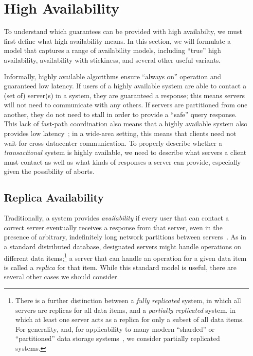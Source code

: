 
\section{High Availability}
\label{sec:availability}

To understand which guarantees can be provided with high availabilty,
we must first define what high availability means. In this section, we
will formulate a model that captures a range of availability models,
including ``true'' high availability, availability with stickiness,
and several other useful variants.

Informally, highly available algorithms ensure ``always on'' operation
and guaranteed low latency. If users of a highly available system are
able to contact a (set of) server(s) in a system, they are guaranteed
a response; this means servers will not need to communicate with any
others. If servers are partitioned from one another, they do not need
to stall in order to provide a ``safe'' query response. This lack of
fast-path coordination also means that a highly available system also
provides low latency~\cite{abadi-pacelc}; in a wide-area setting, this
means that clients need not wait for cross-datacenter
communication. To properly describe whether a \textit{transactional}
system is highly available, we need to describe what servers a client
must contact as well as what kinds of responses a server can provide,
especially given the possibility of aborts.

\subsection{Replica Availability}

Traditionally, a system provides {\em  availability} if every user that
can contact a correct server eventually receives a response from that server,
even in the presence of arbitrary, indefinitely long network
partitions between servers~\cite{gilbert-cap}. As in a standard
distributed database, designated servers might handle operations on
different data items;\footnote{There is a further distinction between
  a \textit{fully replicated} system, in which all servers are
  replicas for all data items, and a \textit{partially replicated}
  system, in which at least one server acts as a replica for only a
  subset of all data items. For generality, and, for applicability to
  many modern ``sharded'' or ``partitioned'' data storage
  systems~\cite{dynamo, pnuts, bigtable, spanner, hstore}, we consider partially
  replicated systems.} a server that can handle an operation for a
given data item is called a \textit{replica} for that item. While this
standard model is useful, there are several other cases we should
consider.

